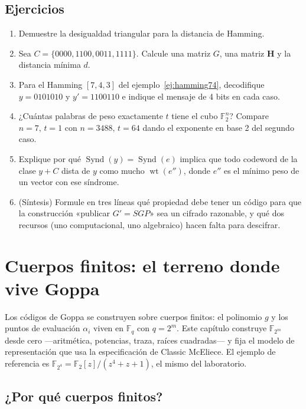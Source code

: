 \documentclass[11pt,a4paper,oneside]{report}
\newcommand{\F}{\mathbb{F}}
\newcommand{\GF}[1]{\mathbb{F}_{#1}}
\newcommand{\wt}{\operatorname{wt}}
\newcommand{\Hmat}{\mathbf{H}}          %
\newcommand{\Ftwo}{\F_2}
\newcommand{\FF}[1]{\F_{2^{#1}}}
\newcommand{\Syn}{\operatorname{Synd}}
\begin{document}
\section{Ejercicios}

\begin{enumerate}[leftmargin=1.6em,itemsep=2pt]
  \item Demuestre la desigualdad triangular para la distancia de Hamming.
  \item Sea $C=\{0000,1100,0011,1111\}$. Calcule una matriz $G$, una
        matriz $\Hmat$ y la distancia mínima $d$.
  \item Para el Hamming $[7,4,3]$ del ejemplo~\ref{ej:hamming74}, decodifique
        $y=0101010$ y $y'=1100110$ e indique el mensaje de 4 bits en cada
        caso.
  \item ¿Cuántas palabras de peso exactamente $t$ tiene el cubo
        $\Ftwo^n$? Compare $n=7,\,t=1$ con $n=3488,\,t=64$ dando el
        exponente en base 2 del segundo caso.
  \item Explique por qué $\Syn(y)=\Syn(e)$ implica que todo codeword de la
        clase $y+C$ dista de $y$ como mucho $\wt(e'')$, donde $e''$ es el
        mínimo peso de un vector con ese síndrome.
  \item \textnormal{(}Síntesis\textnormal{)} Formule en tres líneas qué
        propiedad debe tener un código para que la construcción «publicar
        $G'=SGP$» sea un cifrado razonable, y qué dos recursos (uno
        computacional, uno algebraico) hacen falta para descifrar.
\end{enumerate}

\clearpage

\chapter{Cuerpos finitos: el terreno donde vive Goppa}\label{ch:cuerpos}

\begin{roadmap}
Los códigos de Goppa se construyen sobre cuerpos finitos: el polinomio $g$
y los puntos de evaluación $\alpha_i$ viven en $\GF{q}$ con $q=2^m$. Este
capítulo construye $\GF{2^m}$ desde cero ---aritmética, potencias, traza,
raíces cuadradas--- y fija el modelo de representación que usa la
especificación de Classic McEliece. El ejemplo de referencia es
$\FF4=\F_2[z]/(z^4+z+1)$, el mismo del laboratorio.
\end{roadmap}

\section{¿Por qué cuerpos finitos?}
\end{document}
